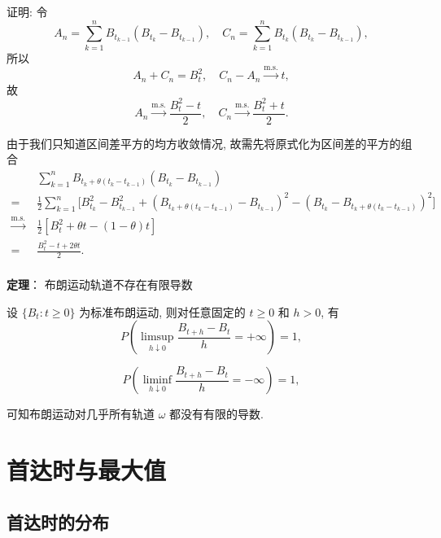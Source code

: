 \documentclass[openany]{ctexbook}
\theoremstyle{kaiti}
\theoremstyle{normal}
\begin{document}
证明: 
令
\begin{equation}
  A_n=\sum_{k=1}^nB_{t_{k-1}}(B_{t_k}-B_{t_{k-1}}),\quad C_n=\sum_{k=1}^nB_{t_{k}}(B_{t_k}-B_{t_{k-1}}),
\end{equation}
所以
\begin{equation}
  A_n+C_n=B_t^2,\quad C_n-A_n\overset{\text{m.s.}}{\to}t,
\end{equation}
故
\begin{equation}
  A_n\overset{\text{m.s.}}{\to}\frac{B_t^2-t}{2},\quad C_n\overset{\text{m.s.}}{\to}\frac{B_t^2+t}{2}.
\end{equation}

由于我们只知道区间差平方的均方收敛情况, 故需先将原式化为区间差的平方的组合
\begin{equation}
  \begin{aligned}
  &\sum_{k=1}^nB_{t_{k}+\theta(t_k-t_{k-1})}(B_{t_k}-B_{t_{k-1}})\\
  =~&\frac{1}{2}\sum_{k=1}^n\Big[B_{t_k}^2-B_{t_{k-1}}^2+(B_{t_{k}+\theta(t_k-t_{k-1})}-B_{t_{k-1}})^2-(B_{t_k}-B_{t_{k}+\theta(t_k-t_{k-1})})^2\Big]\\
  \overset{\text{m.s.}}{\to}~&\frac{1}{2}[B_t^2+\theta t-(1-\theta)t]\\
  =~&\frac{B_t^2-t+2\theta t}{2}.\\
  \end{aligned}
\end{equation}

\textbf{定理}： 布朗运动轨道不存在有限导数

设 $\{B_t:t\geqslant0\}$ 为标准布朗运动, 则对任意固定的 $t\geqslant0$ 和 $h>0$, 有
\begin{equation}
  P\left(\limsup_{h\downarrow0}\frac{B_{t+h}-B_t}{h}=+\infty\right)=1,
\end{equation}

\begin{equation}
  P\left(\liminf_{h\downarrow0}\frac{B_{t+h}-B_t}{h}=-\infty\right)=1,
\end{equation}

可知布朗运动对几乎所有轨道 $\omega$ 都没有有限的导数.

\section{首达时与最大值}

\subsection{首达时的分布}
\end{document}
